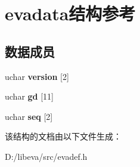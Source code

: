 \hypertarget{structevadata}{\section{evadata结构参考}
\label{structevadata}
}
\subsection*{数据成员}
\begin{DoxyCompactItemize}
\item 
\hypertarget{structevadata_a4401b60634b79e160bec1f767fcb37b2}{uchar {\bfseries version} \mbox{[}2\mbox{]}}\label{structevadata_a4401b60634b79e160bec1f767fcb37b2}

\item 
\hypertarget{structevadata_a6c6c491c64610d808c8784eaa7ea9fe2}{uchar {\bfseries gd} \mbox{[}11\mbox{]}}\label{structevadata_a6c6c491c64610d808c8784eaa7ea9fe2}

\item 
\hypertarget{structevadata_a196e8408af4708667ff4aecc17a4d15d}{uchar {\bfseries seq} \mbox{[}2\mbox{]}}\label{structevadata_a196e8408af4708667ff4aecc17a4d15d}

\end{DoxyCompactItemize}


该结构的文档由以下文件生成：\begin{DoxyCompactItemize}
\item 
\-D\-:/libeva/src/evadef.\-h\end{DoxyCompactItemize}
